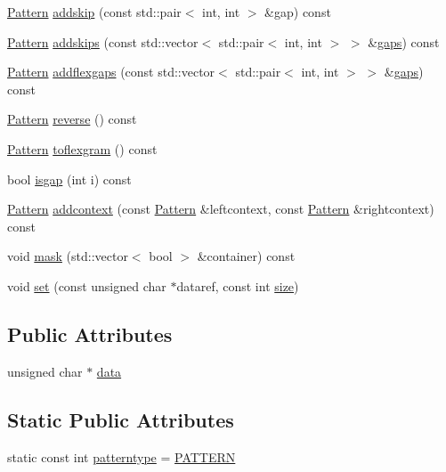 \begin{DoxyCompactItemize}
\item 
\hyperlink{classPattern}{Pattern} \hyperlink{classPattern_a7eee8becce24d9e3ff8c72d65af0856d}{addskip} (const std\+::pair$<$ int, int $>$ \&gap) const 
\item 
\hyperlink{classPattern}{Pattern} \hyperlink{classPattern_acb62137cc96984adba34ca4a1b857dc9}{addskips} (const std\+::vector$<$ std\+::pair$<$ int, int $>$ $>$ \&\hyperlink{classPattern_ad4dd286b352c7e5e66dd73233b0d6b29}{gaps}) const 
\item 
\hyperlink{classPattern}{Pattern} \hyperlink{classPattern_acb0a3e2954c8f74cfa853748e4423fa4}{addflexgaps} (const std\+::vector$<$ std\+::pair$<$ int, int $>$ $>$ \&\hyperlink{classPattern_ad4dd286b352c7e5e66dd73233b0d6b29}{gaps}) const 
\item 
\hyperlink{classPattern}{Pattern} \hyperlink{classPattern_a15e028c7c47223bec756f9a50c9d3fd0}{reverse} () const 
\item 
\hyperlink{classPattern}{Pattern} \hyperlink{classPattern_a542295a795ff5a906044dd9b6b550f0e}{toflexgram} () const 
\item 
bool \hyperlink{classPattern_a971a055b02cf2c7d6f0c6a5a0e4401f0}{isgap} (int i) const 
\item 
\hyperlink{classPattern}{Pattern} \hyperlink{classPattern_ae9b514ce75a9e8a32407684167b8ce99}{addcontext} (const \hyperlink{classPattern}{Pattern} \&leftcontext, const \hyperlink{classPattern}{Pattern} \&rightcontext) const 
\item 
void \hyperlink{classPattern_a1388ffcf485ba7a32417e6a442338f44}{mask} (std\+::vector$<$ bool $>$ \&container) const 
\item 
void \hyperlink{classPattern_afc9539da36985d942552620ea2f26525}{set} (const unsigned char $\ast$dataref, const int \hyperlink{classPattern_a400a18c6a1b6de3eb574b6a0f12c9ca2}{size})
\end{DoxyCompactItemize}
\subsection*{Public Attributes}
\begin{DoxyCompactItemize}
\item 
unsigned char $\ast$ \hyperlink{classPattern_a2e20f4d132daff981db27bb13d3ff2b5}{data}
\end{DoxyCompactItemize}
\subsection*{Static Public Attributes}
\begin{DoxyCompactItemize}
\item 
static const int \hyperlink{classPattern_ab48e128327c90c9c250a6b0d7e8362a3}{patterntype} = \hyperlink{pattern_8h_a351dc5aa88481a949638aeb6cc5e6754ac2ab7901214563c5f2300c42358129f6}{P\+A\+T\+T\+E\+R\+N}
\end{DoxyCompactItemize}


